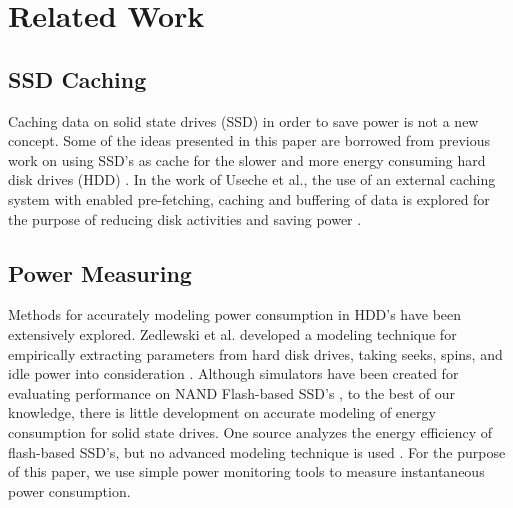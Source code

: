 \section{Related Work}
\label{sec:related}

\subsection{SSD Caching}

Caching data on solid state drives (SSD) in order to save power is not a new
concept. Some of the ideas presented in this paper are borrowed from previous
work on using SSD's as cache for the slower and more energy consuming hard disk
drives (HDD) \cite{flash-disk-hybrid}. In the work of Useche et al., the use of
an external caching system with enabled pre-fetching, caching and buffering of
data is explored for the purpose of reducing disk activities and saving power
\cite{extern-cache-energy-saving}.

\subsection{Power Measuring}

Methods for accurately modeling power consumption in HDD's have been extensively
explored. Zedlewski et al. developed a modeling technique for empirically
extracting parameters from hard disk drives, taking seeks, spins, and idle power
into consideration \cite{hard-disk-power}. Although simulators have been created
for evaluating performance on NAND Flash-based SSD's \cite{flashsim}, to the best
of our knowledge, there is little development on accurate modeling of energy
consumption for solid state drives. One source analyzes the energy efficiency of
flash-based SSD's, but no advanced modeling technique is used
\cite{ssd-energy-efficiency}. For the purpose of this paper, we use simple power
monitoring tools to measure instantaneous power consumption.




